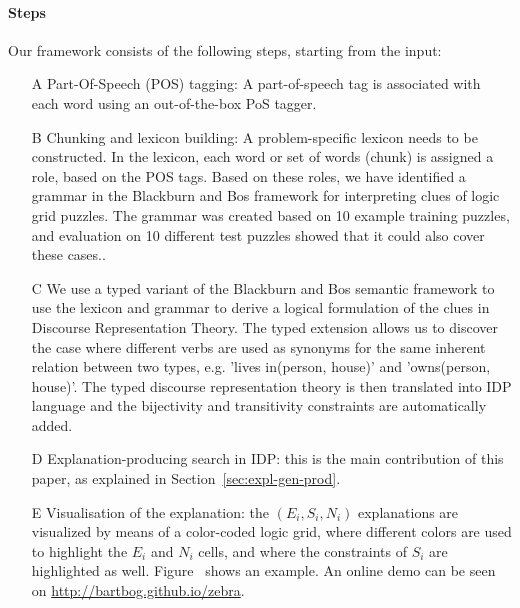 \paragraph{Steps} Our framework consists of the following steps, starting from the input:
\begin{enumerate}\setlength\itemsep{-0.2em}
	\item[A] Part-Of-Speech (POS) tagging: A part-of-speech tag is associated with each word using an out-of-the-box PoS tagger.\\
	\item[B] Chunking and lexicon building: A problem-specific lexicon needs to be constructed. In the lexicon, each word or set of words (chunk) is assigned a role, based on the POS tags. Based on these roles, we have identified a grammar in the Blackburn and Bos framework for interpreting clues of logic grid puzzles. The grammar was created based on 10 example training puzzles, and evaluation on 10 different test puzzles showed that it could also cover these cases..\\
	\item[C] We use a typed variant of the Blackburn and Bos semantic framework to use the lexicon and grammar to derive a logical formulation of the clues in Discourse Representation Theory. The typed extension allows us to discover the case where different verbs are used as synonyms for the same inherent relation between two types, e.g. 'lives in(person, house)' and 'owns(person, house)'. The typed discourse representation theory is then translated into IDP language and the bijectivity and transitivity constraints are automatically added. \\
	\item[D] Explanation-producing search in IDP: this is the main contribution of this paper, as explained in Section~\ref{sec:expl-gen-prod}.\\
	\item[E] Visualisation of the explanation: the $(E_i, S_i, N_i)$ explanations are visualized by means of a color-coded logic grid, where different colors are used to highlight the $E_i$ and $N_i$ cells, and where the constraints of $S_i$ are highlighted as well. Figure~ shows an example. An online demo can be seen on \url{http://bartbog.github.io/zebra}. 
\end{enumerate}


